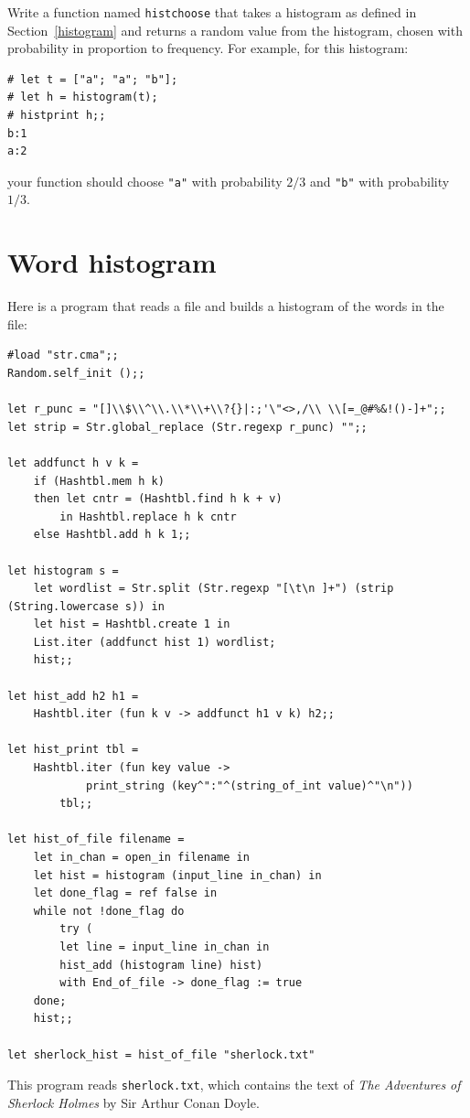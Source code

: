\documentclass[10pt]{book}
\begin{document}
\begin{ex}


Write a function named \verb"histchoose" that takes
a histogram as defined in Section~\ref{histogram} and returns a 
random value from the histogram, chosen with probability
in proportion to frequency.  For example, for this histogram:

\beforeverb
\begin{verbatim}
# let t = ["a"; "a"; "b"];
# let h = histogram(t);
# histprint h;;
b:1
a:2
\end{verbatim}
\afterverb
%
your function should choose {\tt "a"} with probability $2/3$ and {\tt "b"}
with probability $1/3$.
\end{ex}

\section{Word histogram}

Here is a program that reads a file and builds a histogram of the
words in the file:


\beforeverb
\begin{verbatim}
#load "str.cma";;
Random.self_init ();;

let r_punc = "[]\\$\\^\\.\\*\\+\\?{}|:;'\"<>,/\\ \\[=_@#%&!()-]+";;
let strip = Str.global_replace (Str.regexp r_punc) "";;

let addfunct h v k = 
	if (Hashtbl.mem h k)
	then let cntr = (Hashtbl.find h k + v)
		in Hashtbl.replace h k cntr
	else Hashtbl.add h k 1;;

let histogram s = 
	let wordlist = Str.split (Str.regexp "[\t\n ]+") (strip (String.lowercase s)) in
	let hist = Hashtbl.create 1 in
	List.iter (addfunct hist 1) wordlist;
	hist;;

let hist_add h2 h1 =
	Hashtbl.iter (fun k v -> addfunct h1 v k) h2;;

let hist_print tbl = 
	Hashtbl.iter (fun key value ->
			print_string (key^":"^(string_of_int value)^"\n"))
		tbl;;

let hist_of_file filename =
	let in_chan = open_in filename in
	let hist = histogram (input_line in_chan) in
	let done_flag = ref false in
	while not !done_flag do
		try (
		let line = input_line in_chan in
		hist_add (histogram line) hist)
		with End_of_file -> done_flag := true
	done;
	hist;;

let sherlock_hist = hist_of_file "sherlock.txt"
\end{verbatim}
\afterverb
%
This program reads {\tt sherlock.txt}, which contains the text of {\em
  The Adventures of Sherlock Holmes} by Sir Arthur Conan Doyle.
\end{document}
